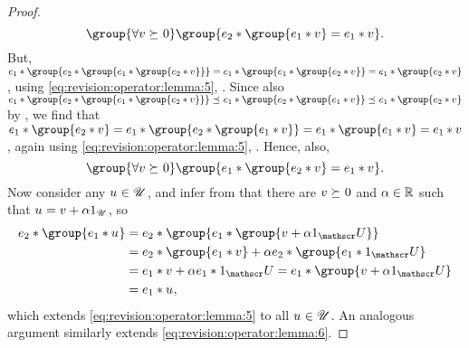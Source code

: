 \documentclass[preprint]{isipta2025}
\begin{document}
\begin{proof}
\begin{equation}\label{eq:revision:operator:lemma:5}
\group{\forall\altopt\optgeq0}
\group{\eventopt[2]\ast\group{\eventopt[1]\ast\altopt}=\eventopt[1]\ast\altopt}.
\end{equation}
But, \(\eventopt[1]\ast\group{\eventopt[2]\ast\group{\eventopt[1]\ast\group{\eventopt[2]\ast\altopt}}}=\eventopt[1]\ast\group{\eventopt[1]\ast\group{\eventopt[2]\ast\altopt}}=\eventopt[1]\ast\group{\eventopt[2]\ast\altopt}\), using \cref{eq:revision:operator:lemma:5}, .
Since also \(\eventopt[1]\ast\group{\eventopt[2]\ast\group{\eventopt[1]\ast\group{\eventopt[2]\ast\altopt}}}\optleq\eventopt[1]\ast\group{\eventopt[2]\ast\group{\eventopt[1]\ast\altopt}}\optleq\eventopt[1]\ast\group{\eventopt[2]\ast\altopt}\) by , we find that \(\eventopt[1]\ast\group{\eventopt[2]\ast\altopt}=\eventopt[1]\ast\group{\eventopt[2]\ast\group{\eventopt[1]\ast\altopt}}=\eventopt[1]\ast\group{\eventopt[1]\ast\altopt}=\eventopt[1]\ast\altopt\), again using \cref{eq:revision:operator:lemma:5}, .
Hence, also,
\begin{equation}\label{eq:revision:operator:lemma:6}
\group{\forall\altopt\optgeq0}
\group{\eventopt[1]\ast\group{\eventopt[2]\ast\altopt}=\eventopt[1]\ast\altopt}.
\end{equation}
Now consider any \(u_{}\in\mathscr{U}\), and infer from  that there are \(v_{}\mathrel{\succeq_{}}0\) and \(\alpha\in\mathbb{R}\) such that \(u_{}=v_{}+\alpha1_{\mathscr{U}}\), so
\begin{align*}
\eventopt[2]\ast\group{\eventopt[1]\ast\opt}
&=\eventopt[2]\ast\group{\eventopt[1]\ast\group{\altopt+\alpha\uniteventopt}}\\
&=\eventopt[2]\ast\group{\eventopt[1]\ast\altopt}+\alpha\eventopt[2]\ast\group{\eventopt[1]\ast\uniteventopt}\\
&=\eventopt[1]\ast\altopt+\alpha\eventopt[1]\ast\uniteventopt
=\eventopt[1]\ast\group{\altopt+\alpha\uniteventopt}\\
&=\eventopt[1]\ast\opt,
\end{align*}
which extends \cref{eq:revision:operator:lemma:5} to all \(u_{}\in\mathscr{U}\).
An analogous argument similarly extends \cref{eq:revision:operator:lemma:6}.
\end{proof}
\end{document}
